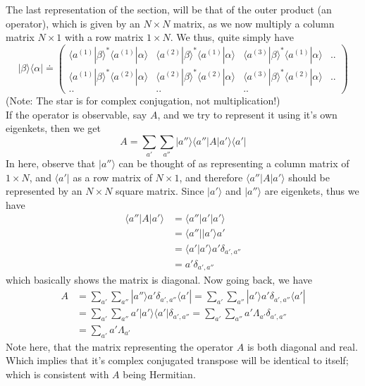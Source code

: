 \documentclass[12pt]{article}
\def\bra#1{\langle#1|}
\def\ket#1{|#1 \rangle}
\def\inpr#1#2{\langle #1|#2 \rangle}
\def\oupr#1#2{| #1 \rangle \langle #2 |}
\def\braket#1#2#3{\langle#1|#2|#3\rangle}
\begin{document}
				\par
				The last representation of the section, will be that of the outer product (an operator), which is given by an $N\times N$ matrix, as we now multiply a column matrix $N\times 1$ with a row matrix $1\times N$. We thus, quite simply have
				\begin{equation}
					\oupr \beta \alpha \doteq 
					\left( 
					\begin{array}{cccc}
						\inpr{a^{(1)}}\beta^* \inpr{a^{(1)}}\alpha &\inpr{a^{(2)}}\beta^* \inpr{a^{(1)}}\alpha &\inpr{a^{(3)}}\beta^* \inpr{a^{(1)}}\alpha & .. \\
						\inpr{a^{(1)}}\beta^* \inpr{a^{(2)}}\alpha &\inpr{a^{(2)}}\beta^* \inpr{a^{(2)}}\alpha &\inpr{a^{(3)}}\beta^* \inpr{a^{(2)}}\alpha & .. \\
						.. & .. & ..
					\end{array}
					\right)
				\end{equation}
				(Note: The star is for complex conjugation, not multiplication!)\\
				If the operator is observable, say $A$, and we try to represent it using it's own eigenkets, then we get
				\begin{equation}
					A = \sum_{a'}\sum_{a''} \oupr{a''}{a''} A \oupr{a'}{a'} 
				\end{equation}
				In here, observe that $\ket {a''}$ can be thought of as representing a column matrix of $1 \times N$, and $\bra {a'}$ as a row matrix of $N \times 1$, and therefore $\braket {a''}A{a'}$ should be represented by an $N \times N$ square matrix. Since $\ket {a'}$ and $\ket {a''}$ are eigenkets, thus we have
				\begin{align}
					\bra {a''} A \ket {a'} 	&= \bra {a''} a' \ket {a'}\\
											&= \bra {a''} \ket{a'} a' \\
											&= \inpr{a'}{a'} a' \delta_{a',a''} \\
											&= a' \delta_{a',a''}
				\end{align}
				which basically shows the matrix is diagonal. Now going back, we have
				\begin{align}
					A 	&= \sum_{a'}\sum_{a''} \ket{a''} a' \delta_{a',a''} \bra{a'}
						= \sum_{a'}\sum_{a''} \ket{a'} a' \delta_{a',a''} \bra{a'} \\
						&= \sum_{a'}\sum_{a''} a' \ket{a'} \bra{a'}  \delta_{a',a''}
						= \sum_{a'}\sum_{a''} a' \Lambda_{a'}  \delta_{a',a''}\\
						&= \sum_{a'} a' \Lambda_{a'} \label{observable_operators_expansion}
				\end{align}
				Note here, that the matrix representing the operator $A$ is both diagonal and real. Which implies that it's complex conjugated transpose will be identical to itself; which is consistent with $A$ being Hermitian.				
\end{document}
